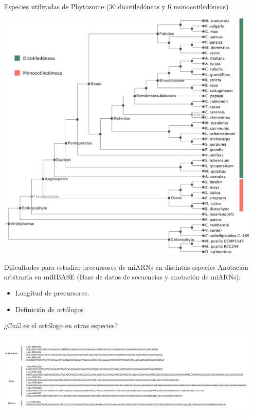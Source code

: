 \documentclass{beamer}
\begin{document}
\begin{frame}{Especies utilizadas de Phytozome (30 dicotiledóneas y 6 monocotiledóneas)}
	\begin{center}
		\includegraphics[width=.6\textwidth]{img/treePhytozome.png}
	\end{center}
\end{frame}


\begin{frame}{Dificultades para estudiar precursores de miARNs en distintas especies}
    Anotación arbitraria en miRBASE (Base de datos de secuencias y anotación de miARNs).
    \begin{itemize}
        \item Longitud de precursores.
        \item Definición de ortólogos
    \end{itemize}
\end{frame}

\begin{frame}{¿Cuál es el ortólogo en otras especies?}
	\begin{center}
		\includegraphics[width=1\textwidth]{img/ortologos01.png}
	\end{center}
\end{frame}

    
\end{document}
